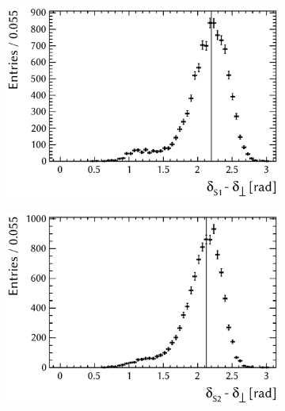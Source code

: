 \begin{figure}[tbp]
  \centering
  \begin{subfigure}{0.49\textwidth}
    \includegraphics[width=\textwidth]{graphics/results/parDist_polarDep_ASOddPhase_bin0}
    \caption{}
  \end{subfigure}
  \hfill%
  \begin{subfigure}{0.49\textwidth}
    \includegraphics[width=\textwidth]{graphics/results/parDist_polarDep_ASOddPhase_bin1}
    \caption{}
  \end{subfigure}


\end{figure}
